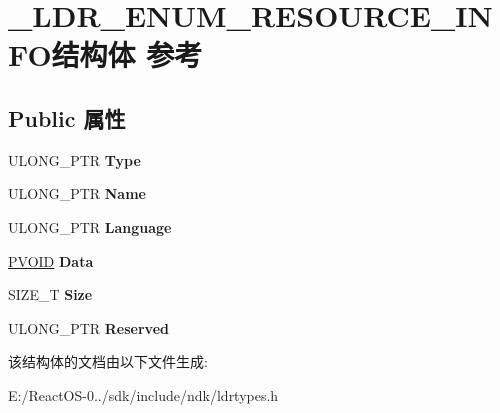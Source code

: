 \hypertarget{struct___l_d_r___e_n_u_m___r_e_s_o_u_r_c_e___i_n_f_o}{}\section{\+\_\+\+L\+D\+R\+\_\+\+E\+N\+U\+M\+\_\+\+R\+E\+S\+O\+U\+R\+C\+E\+\_\+\+I\+N\+F\+O结构体 参考}
\label{struct___l_d_r___e_n_u_m___r_e_s_o_u_r_c_e___i_n_f_o}
\subsection*{Public 属性}
\begin{DoxyCompactItemize}
\item 
\mbox{\label{struct___l_d_r___e_n_u_m___r_e_s_o_u_r_c_e___i_n_f_o_af54b7537723226a3ff5af22936f5b5b8}} 
U\+L\+O\+N\+G\+\_\+\+P\+TR {\bfseries Type}
\item 
\mbox{\label{struct___l_d_r___e_n_u_m___r_e_s_o_u_r_c_e___i_n_f_o_ad5f2e29067e9ddaadf1111d58daccbdf}} 
U\+L\+O\+N\+G\+\_\+\+P\+TR {\bfseries Name}
\item 
\mbox{\label{struct___l_d_r___e_n_u_m___r_e_s_o_u_r_c_e___i_n_f_o_a145ae1d163af1901a1c67cac8b003d79}} 
U\+L\+O\+N\+G\+\_\+\+P\+TR {\bfseries Language}
\item 
\mbox{\label{struct___l_d_r___e_n_u_m___r_e_s_o_u_r_c_e___i_n_f_o_a4b05cc193eed46dab579b94c3bd4866e}} 
\hyperlink{interfacevoid}{P\+V\+O\+ID} {\bfseries Data}
\item 
\mbox{\label{struct___l_d_r___e_n_u_m___r_e_s_o_u_r_c_e___i_n_f_o_ae061ac1a8e73a2ecfeceb937aa04b5d9}} 
S\+I\+Z\+E\+\_\+T {\bfseries Size}
\item 
\mbox{\label{struct___l_d_r___e_n_u_m___r_e_s_o_u_r_c_e___i_n_f_o_adee1bccd56796ee3700a0328f1198426}} 
U\+L\+O\+N\+G\+\_\+\+P\+TR {\bfseries Reserved}
\end{DoxyCompactItemize}


该结构体的文档由以下文件生成\+:\begin{DoxyCompactItemize}
\item 
E\+:/\+React\+O\+S-\/0../sdk/include/ndk/ldrtypes.\+h\end{DoxyCompactItemize}
